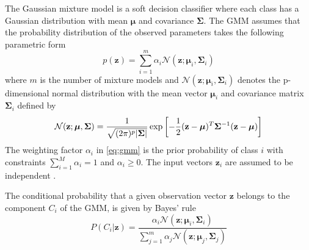 The Gaussian mixture model is a soft decision classifier where each class has a Gaussian distribution with mean $\boldsymbol{\mu}$ and covariance $\mathbf{\Sigma}$. The GMM assumes that the probability distribution of the observed parameters takes the following parametric form
\newcommand{\nnn}{\mathcal N}
\begin{equation}
	\label{eq:gmm}
	p(\mathbf{z}) = \sum_{i=1}^{m} \alpha_i \nnn(\mathbf{z}; \boldsymbol{\mu}_i, \mathbf{\Sigma}_i)
\end{equation}
where $m$ is the number of mixture models and $\nnn(\mathbf{z}; \boldsymbol{\mu}_i, \mathbf{\Sigma}_i)$ denotes the p-dimensional normal distribution \cite{statistikk} with the mean vector $\boldsymbol{\mu}_i$ and covariance matrix $\mathbf{\Sigma}_i$ defined by
\begin{equation}
	\nnn(\mathbf{z}; \boldsymbol{\mu}, \mathbf{\Sigma}) = \frac{1}{\sqrt{(2\pi)^p\abs{\mathbf{\Sigma}}}} \exp\sbrackets{-\frac{1}{2} (\mathbf{z} -\boldsymbol{\mu})^T \mathbf{\Sigma}^{-1} (\mathbf{z} -\boldsymbol{\mu})}
\end{equation}
The weighting factor $\alpha_i$ in \eqref{eq:gmm} is the prior probability of class $i$ with constraints $\sum_{i=1}^{M}\alpha_i = 1$ and $\alpha_i \geq 0$. The input vectors $\mathbf{z}_i$ are assumed to be independent \cite{stylianou98}.


The conditional probability that a given observation vector $\mathbf{z}$ belongs to the component $C_i$ of the GMM, is given by Bayes' rule \cite{statistikk}
\begin{equation}
	\label{eq:bayes}
	P(C_i\vert \mathbf{z}) = \frac{\alpha_i \nnn(\mathbf{z}; \boldsymbol{\mu}_i, \mathbf{\Sigma}_i)}{\sum_{j=1}^{m}\alpha_j \nnn(\mathbf{z}; \boldsymbol{\mu}_j, \mathbf{\Sigma}_j)}
\end{equation}

